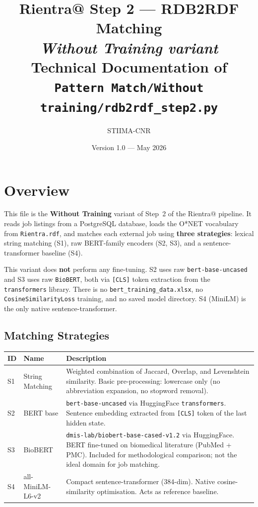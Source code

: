﻿\documentclass[12pt,a4paper]{article}
\title{\textbf{Rientra@ Step 2 --- RDB2RDF Matching}\\[0.4em]
       \large \textit{Without Training variant}\\[0.5em]
       \normalsize Technical Documentation of\\
       \texttt{Pattern Match/Without training/rdb2rdf\_step2.py}}
\author{STIIMA-CNR}
\date{Version 1.0 --- May 2026}
\begin{document}
\begin{titlepage}\centering\maketitle\end{titlepage}
\tableofcontents
\newpage

\clearpage
\section{Overview}

This file is the \textbf{Without Training} variant of Step~2 of the Rientra@ pipeline. It reads job listings from a PostgreSQL database, loads the O*NET vocabulary from \texttt{Rientra.rdf}, and matches each external job using \textbf{three strategies}: lexical string matching (S1), raw BERT-family encoders (S2, S3), and a sentence-transformer baseline (S4).

\begin{tcolorbox}[colback=noteblue!40, colframe=blue!60!black,
                  title=Key difference from the ``Against Training'' variant]
This variant does \textbf{not} perform any fine-tuning. S2 uses raw \texttt{bert-base-uncased} and S3 uses raw \texttt{BioBERT}, both via \texttt{[CLS]} token extraction from the \texttt{transformers} library. There is no \texttt{bert\_training\_data.xlsx}, no \texttt{CosineSimilarityLoss} training, and no saved model directory. S4 (MiniLM) is the only native sentence-transformer.
\end{tcolorbox}

\subsection{Matching Strategies}

\begin{longtable}{@{}P{1.5cm}P{3.5cm}P{9.5cm}@{}}
\toprule
\textbf{ID} & \textbf{Name} & \textbf{Description} \\
\midrule
\endhead
S1 & String Matching &
  Weighted combination of Jaccard, Overlap, and Levenshtein similarity.
  Basic pre-processing: lowercase only (no abbreviation expansion, no stopword removal). \\
S2 & BERT base &
  \texttt{bert-base-uncased} via HuggingFace \texttt{transformers}. Sentence embedding
  extracted from \texttt{[CLS]} token of the last hidden state. \\
S3 & BioBERT &
  \texttt{dmis-lab/biobert-base-cased-v1.2} via HuggingFace. BERT fine-tuned on
  biomedical literature (PubMed + PMC). Included for methodological comparison;
  not the ideal domain for job matching. \\
S4 & all-MiniLM-L6-v2 &
  Compact sentence-transformer (384-dim). Native cosine-similarity optimisation.
  Acts as reference baseline. \\
\bottomrule
\end{longtable}
\end{document}
